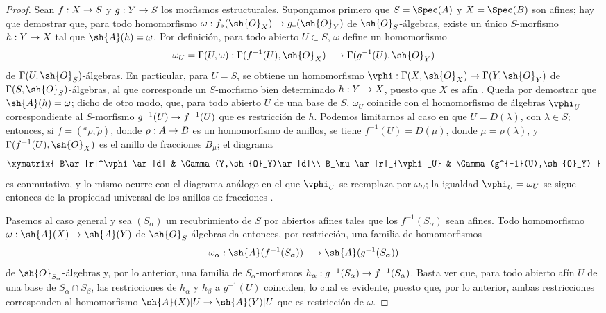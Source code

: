 \documentclass[oneside,10pt]{amsart}
\makeatletter
\newcommand{\ega@arrow}[2]{\mathchoice{#1}{#2}{#2}{#2}}
\renewcommand{\to}{\ega@arrow{\longrightarrow}{\rightarrow}}
\newcommand{\oldpage}[2][]{\marginnote{\normalfont\footnotesize\textbf{#1}~|~#2}\ignorespaces}
\makeatother
\begin{document}
\begin{proof}
Sean $f:X\to S$ y $g:Y\to S$ los morfismos estructurales.
Supongamos primero que $S=\Spec(A)$ y $X=\Spec(B)$ son afines; hay que demostrar que, para todo homomorfismo $\omega:f_*(\sh{O}_X)\to g_*(\sh{O}_Y)$ de $\sh{O}_S$-álgebras, existe un único $S$-morfismo $h:Y\to X$ tal que $\sh{A}(h)=\omega$.
Por definición, para todo abierto $U\subset S$, $\omega$ define un homomorfismo
\[
  \omega_U=\Gamma(U,\omega):
  \Gamma(f^{-1}(U),\sh{O}_X)\to
  \Gamma(g^{-1}(U),\sh{O}_Y)
\]
de $\Gamma(U,\sh{O}_S)$-álgebras.
En particular, para $U=S$, se obtiene un homomorfismo $\vphi:\Gamma(X,\sh{O}_X)\to\Gamma(Y,\sh{O}_Y)$ de $\Gamma(S,\sh{O}_S)$-álgebras, al que corresponde un $S$-morfismo bien determinado $h:Y\to X$, puesto que $X$ es afín .
Queda por demostrar que $\sh{A}(h)=\omega$; dicho de otro modo, que, para todo abierto $U$ de una base de $S$, $\omega_U$ coincide con el homomorfismo de álgebras $\vphi_U$ correspondiente al $S$-morfismo $g^{-1}(U)\to f^{-1}(U)$ que es restricción de $h$.
Podemos limitarnos al caso en que $U=D(\lambda)$, con $\lambda\in S$; entonces, si $f=({}^a\rho,\widetilde{\rho})$, donde $\rho:A\to B$ es un homomorfismo de anillos, se tiene $f^{-1}(U)=D(\mu)$, donde $\mu=\rho(\lambda)$, y $\Gamma(f^{-1}(U),\sh{O}_X)$ es el anillo de fracciones $B_\mu$; el diagrama
\[
  \xymatrix{
    B\ar[r]^\vphi\ar[d] &
    \Gamma(Y,\sh{O}_Y)\ar[d]\\
    B_\mu\ar[r]_{\vphi_U} &
    \Gamma(g^{-1}(U),\sh{O}_Y)
  }
\]
es conmutativo, y lo mismo ocurre con el diagrama análogo en el que $\vphi_U$ se reemplaza por $\omega_U$; la igualdad $\vphi_U=\omega_U$ se sigue entonces de la propiedad universal de los anillos de fracciones .

Pasemos al caso general y sea $(S_\alpha)$ un recubrimiento de $S$ por abiertos afines
\oldpage[II]{8}
tales que los $f^{-1}(S_\alpha)$ sean afines.
Todo homomorfismo $\omega:\sh{A}(X)\to\sh{A}(Y)$ de $\sh{O}_S$-álgebras da entonces, por restricción, una familia de homomorfismos
\[
  \omega_\alpha:\sh{A}(f^{-1}(S_\alpha))\to\sh{A}(g^{-1}(S_\alpha))
\]
de $\sh{O}_{S_\alpha}$-álgebras y, por lo anterior, una familia de $S_\alpha$-morfismos $h_\alpha:g^{-1}(S_\alpha)\to f^{-1}(S_\alpha)$.
Basta ver que, para todo abierto afín $U$ de una base de $S_\alpha\cap S_\beta$, las restricciones de $h_\alpha$ y $h_\beta$ a $g^{-1}(U)$ coinciden, lo cual es evidente, puesto que, por lo anterior, ambas restricciones corresponden al homomorfismo $\sh{A}(X)|U\to\sh{A}(Y)|U$ que es restricción de $\omega$.
\end{proof}
\end{document}
